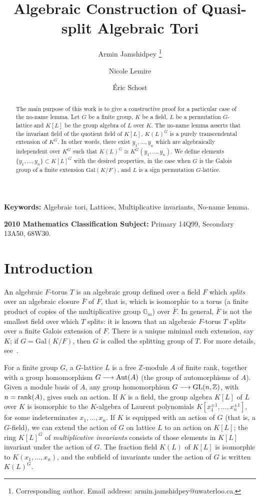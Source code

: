\documentclass[12pt]{article}
\title{Algebraic Construction of Quasi-split Algebraic Tori}
\author[1]{Armin Jamshidpey \footnote{Corresponding author. Email address: armin.jamshidpey@uwaterloo.ca.}}
\author[2]{Nicole Lemire}
\author[1]{\'Eric Schost}
\affil[1]{David Cheriton School of Computer Science, University of Waterloo}
\affil[2]{Department of Mathematics, University of Western Ontario}
\theoremstyle{plain}
\newcommand{\Z}{\ensuremath{\mathbb{Z}}}
\begin{document}
\maketitle


\begin{abstract}

The main purpose of this work is to give a constructive proof for a 
particular case of the no-name lemma. Let $G$ be a
finite group, $K$ be a field, $L$ be a permutation $G$-lattice 
and $K[L]$ be the group algebra of $L$ over
$K$. The no-name lemma asserts that the invariant field of the
quotient field of $K[L]$, $K(L)^G$ is a purely transcendental
extension of $K^G$. In other words, there exist $y_1, \ldots , y_n$
which are algebraically independent over $K^G$ such that $K(L)^G \cong
K^G(y_1, \ldots , y_n)$.  We define elements $\lbrace y_1, \ldots, y_n
\rbrace \subset K[L]^G$ with the desired properties, in the case when
$G$ is the Galois group of a finite extension $\mathrm{Gal}(K/F)$, and
$L$ is a sign permutation $G$-lattice.
\end{abstract}

 \textbf{Keywords:} Algebraic tori, Lattices, Multiplicative invariants, No-name lemma.
 
 \textbf{2010 Mathematics Classification Subject:} Primary 14Q99, Secondary 13A50, 68W30.

\section{Introduction}


An algebraic $F$-torus $T$ is an algebraic group defined over a field
$F$ which {\em splits} over an algebraic closure $\bar F$ of $F$, that
is, which is isomorphic to a torus (a finite product of copies of the
multiplicative group $\mathbb{G}_m$) over $\bar{F}$. In general,
$\bar{F}$ is not the smallest field over which $T$ splits: it is known
that an algebraic $F$-torus $T$ splits over a finite Galois extension
of $F$. There is a unique minimal such extension, say $K$; if $G =
\mathrm{Gal}(K/F)$, then $G$ is called the splitting group of $T$. For
more details, 
see~\cite[p. 27]{Voskresenskii}.

For a finite group $G$, a $G$-lattice $L$ is a free $\Z$-module $A$ of
finite rank, together with a group homomorphism $G \longrightarrow
{\rm Aut}(A)$ (the group of automorphisms of $A$). Given a module
basis of $A$, any group homomorphism $G \longrightarrow {\rm
  GL}(n,\Z)$, with $n={\rm rank}(A)$, gives such an action.  If $K$ is
a field, the group algebra $K[L]$ of $L$ over $K$ is isomorphic to the
$K$-algebra of Laurent polynomials $K[x_1^{\pm 1},\dots,x_n^{\pm 1}]$,
for some indeterminates $x_1,\dots,x_n$.  If $K$ is equipped with an
action of $G$ (that is, a $G$-field), we can extend the action of $G$
on lattice $L$ to an action on $K[L]$; the ring $K[L]^G$ of {\em
  multiplicative invariants} consists of those elements in $K[L]$
invariant under the action of $G$. The fraction field $K(L)$ of $K[L]$
is isomorphic to $K(x_1,\dots,x_n)$, and the subfield of invariants
under the action of $G$ is written $K(L)^G$.
\end{document}
